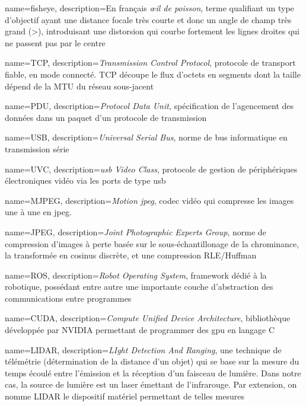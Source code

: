\makeglossaries

{
	name={fisheye},
	description={En français \emph{\oe{}il de poisson}, terme qualifiant un type d'objectif ayant une distance focale très courte et donc un angle de champ très grand (>\degre), introduisant une distorsion qui courbe fortement les lignes droites qui ne passent pas par le centre}
}


{
	name={TCP},
	description={\emph{Transmission Control Protocol}, protocole de transport fiable, en mode connecté. TCP découpe le flux d’octets en segments dont la taille dépend de la MTU du réseau sous-jacent}
}

{
	name={PDU},
	description={\emph{Protocol Data Unit}, spécification de l'agencement des données dans un paquet d'un protocole de transmission}
}

{
	name={USB},
	description={\emph{Universal Serial Bus}, norme de bus informatique en transmission série}
}

{
	name={UVC},
	description={\emph{\gls{usb} Video Class}, protocole de gestion de périphériques électroniques vidéo via les ports de type \gls{usb}}
}

{
	name={MJPEG},
	description={\emph{Motion \gls{jpeg}}, codec vidéo qui compresse les images une à une en \gls{jpeg}.}
}

{
	name={JPEG},
	description={\emph{Joint Photographic Experts Group}, norme de compression d'images à perte basée sur le sous-échantillonage de la chrominance, la transformée en cosinus discrète, et une compression RLE/Huffman}
}

{
	name={ROS},
	description={\emph{Robot Operating System}, framework dédié à la robotique, possédant entre autre une importante couche d'abstraction des communications entre programmes}
}

{
	name={CUDA},
	description={\emph{Compute Unified Device Architecture}, bibliothèque développée par NVIDIA permettant de programmer des \gls{gpu} en langage C}
}


{
	name={LIDAR},
	description={\emph{LIght Detection And Ranging}, une technique de télémétrie (détermination de la distance d'un objet) qui se base sur la mesure du temps écoulé entre l'émission et la réception d'un faisceau de lumière. Dans notre cas, la source de lumière est un laser émettant de l'infrarouge. Par extension, on nomme LIDAR le dispositif matériel permettant de telles mesures}
}

